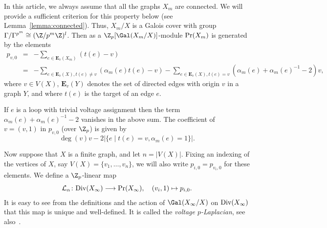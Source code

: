 In this article, we always assume that all the graphs $X_m$ are connected. We will provide a sufficient criterion for this property below (see Lemma~\ref{lemma:connected}). Thus, $X_m/X$ is a Galois cover with group ${\Gamma/\Gamma^{p^m} \cong (\Z/p^m\Z)^l}$. Then as a $\Z_p[\Gal(X_m/X)]$-module $\textup{Pr}(X_m)$ is generated by the elements
\begin{eqnarray*} p_{v,0} & = & -\sum_{e \in \textbf{E}_v(X_m)}(t(e)-v) \\ 
	& = & -\sum_{e\in \textbf{E}_v(X),t(e)\neq v}(\alpha_m(e)t(e)-v)-\sum_{e\in \textbf{E}_v(X),t(e)=v}(\alpha_m(e)+\alpha_m(e)^{-1}-2)v,\end{eqnarray*} 
where ${v \in V(X)}$, $\textbf{E}_v(Y)$ denotes the set of directed edges with origin $v$ in a graph $Y$, and where $t(e)$ is the target of an edge $e$.

If $e$ is a loop with trivial voltage assignment then the term ${\alpha_m(e) + \alpha_m(e)^{-1} - 2}$ vanishes in the above sum. The coefficient of ${v = (v,1)}$ in $p_{v,0}$ (over $\Z_p$) is given by \[\deg(v)v-2\vert \{e\mid t(e)=v,\alpha_m(e)=1\}\vert.\] 

Now suppose that $X$ is a finite graph, and let ${n = |V(X)|}$. 
Fixing an indexing of the vertices of $X$, say ${V(X) = \{ v_1, \ldots, v_n\}}$, we will also write ${p_{i,0} = p_{v_i,0}}$ for these elements. We define a $\Z_p$-linear map
\[\mathcal{L}_\alpha\colon \textup{Div}(X_\infty)\longrightarrow  \textup{Pr}(X_\infty), \quad (v_{i},1) \mapsto p_{i,0}.\]
It is easy to see from the definitions and the action of $\Gal(X_\infty/X)$ on $\textup{Div}(X_\infty)$ that this map is unique and well-defined. It is called the \emph{voltage $p$-Laplacian}, see also~\cite{diss-gonet}. 

